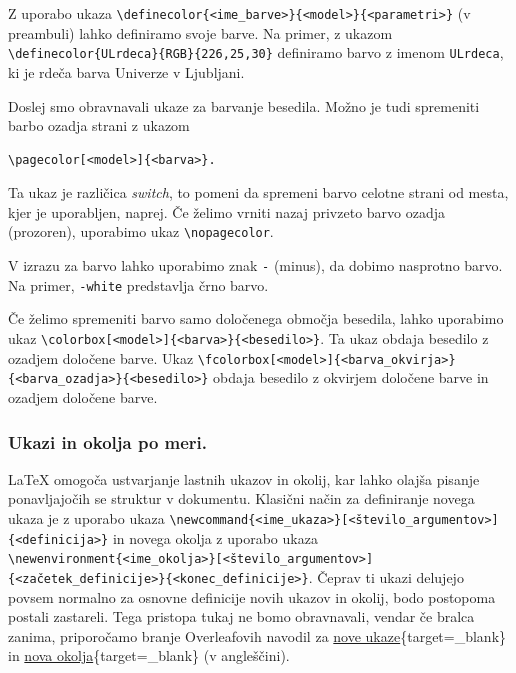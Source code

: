 Z uporabo ukaza \texttt{{\textbackslash}definecolor\{\textless ime\_barve\textgreater \}\{\textless model\textgreater \}\{\textless parametri\textgreater \}} (v preambuli) lahko definiramo svoje barve. Na primer, z ukazom \texttt{{\textbackslash}definecolor\{ULrdeca\}\{RGB\}\{226,25,30\}} definiramo barvo z imenom \texttt{ULrdeca}, ki je rdeča barva Univerze v Ljubljani.

Doslej smo obravnavali ukaze za barvanje besedila. Možno je tudi spremeniti barbo ozadja strani z ukazom

\begin{verbatim}
\pagecolor[<model>]{<barva>}.
\end{verbatim}

Ta ukaz je različica \textit{switch}, to pomeni da spremeni barvo celotne strani od mesta, kjer je uporabljen, naprej. Če želimo vrniti nazaj privzeto barvo ozadja (prozoren), uporabimo ukaz \texttt{{\textbackslash}nopagecolor}.

V izrazu za barvo lahko uporabimo znak \texttt{-} (minus), da dobimo nasprotno barvo. Na primer, \texttt{-white} predstavlja črno barvo.

Če želimo spremeniti barvo samo določenega območja besedila, lahko uporabimo ukaz \texttt{{\textbackslash}colorbox[\textless model\textgreater ]\{\textless barva\textgreater \}\{\textless besedilo\textgreater \}}.
Ta ukaz obdaja besedilo z ozadjem določene barve.
Ukaz \texttt{{\textbackslash}fcolorbox[\textless model\textgreater ]\{\textless barva\_okvirja\textgreater \}\{\textless barva\_ozadja\textgreater \}\{\textless besedilo\textgreater \}} obdaja besedilo z okvirjem določene barve in ozadjem določene barve.

\subsubsection{Ukazi in okolja po meri.}

LaTeX omogoča ustvarjanje lastnih ukazov in okolij, kar lahko olajša pisanje ponavljajočih se struktur v dokumentu.
Klasični način za definiranje novega ukaza je z uporabo ukaza \texttt{{\textbackslash}newcommand\{\textless ime\_ukaza\textgreater \}[\textless število\_argumentov\textgreater ]\{\textless definicija\textgreater \}} in novega okolja z uporabo ukaza \texttt{{\textbackslash}newenvironment\{\textless ime\_okolja\textgreater \}[\textless število\_argumentov\textgreater ]\{\textless začetek\_definicije\textgreater \}\{\textless konec\_definicije\textgreater \}}.
Čeprav ti ukazi delujejo povsem normalno za osnovne definicije novih ukazov in okolij, bodo postopoma postali zastareli.
Tega pristopa tukaj ne bomo obravnavali, vendar če bralca zanima, priporočamo branje Overleafovih navodil za \href{https://www.overleaf.com/learn/latex/Commands}{nove ukaze}\{target=\_blank\} in \href{https://www.overleaf.com/learn/latex/Environments}{nova okolja}\{target=\_blank\} (v angleščini).


